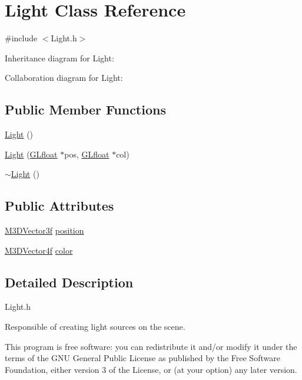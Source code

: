 \hypertarget{class_light}{\section{Light Class Reference}
\label{class_light}
}


{\ttfamily \#include $<$Light.\-h$>$}



Inheritance diagram for Light\-:


Collaboration diagram for Light\-:
\subsection*{Public Member Functions}
\begin{DoxyCompactItemize}
\item 
\hyperlink{class_light_aeb5df09a25a32f19fdffa761268ba24f}{Light} ()
\item 
\hyperlink{class_light_a76520ce0deb942b615296b2f59071131}{Light} (\hyperlink{_g_l_e_w_2glew_8h_a4a966015c733cb5fe2733de64a62a3a5}{G\-Lfloat} $\ast$pos, \hyperlink{_g_l_e_w_2glew_8h_a4a966015c733cb5fe2733de64a62a3a5}{G\-Lfloat} $\ast$col)
\item 
\hyperlink{class_light_ad0e59fad13bb6cfadc25b2c477e9ddc7}{$\sim$\-Light} ()
\end{DoxyCompactItemize}
\subsection*{Public Attributes}
\begin{DoxyCompactItemize}
\item 
\hyperlink{math3d_8h_a2163fe22bd4208b846d22ec7e74cf858}{M3\-D\-Vector3f} \hyperlink{class_light_ad047885927f38a87ac7e9d196fe9f617}{position}
\item 
\hyperlink{math3d_8h_a7da2e6b342ba064a875bf5bfc5dadb6f}{M3\-D\-Vector4f} \hyperlink{class_light_ae9514e53f145e55f4577669fb90eb643}{color}
\end{DoxyCompactItemize}


\subsection{Detailed Description}
Light.\-h

Responsible of creating light sources on the scene.

This program is free software\-: you can redistribute it and/or modify it under the terms of the G\-N\-U General Public License as published by the Free Software Foundation, either version 3 of the License, or (at your option) any later version.

